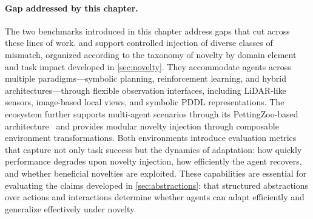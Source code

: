 \paragraph{Gap addressed by this chapter.}
The two benchmarks introduced in this chapter address gaps that cut across these lines of work. \NovelGridworlds{} and \NovelGym{} support controlled injection of diverse classes of mismatch, organized according to the taxonomy of novelty by domain element and task impact developed in \cref{sec:novelty}. They accommodate agents across multiple paradigms---symbolic planning, reinforcement learning, and hybrid architectures---through flexible observation interfaces, including LiDAR-like sensors, image-based local views, and symbolic PDDL representations. The \NovelGym{} ecosystem further supports multi-agent scenarios through its PettingZoo-based architecture~\citep{terry2021pettingzoo} and provides modular novelty injection through composable environment transformations. Both environments introduce evaluation metrics that capture not only task success but the dynamics of adaptation: how quickly performance degrades upon novelty injection, how efficiently the agent recovers, and whether beneficial novelties are exploited. These capabilities are essential for evaluating the claims developed in \cref{sec:abstractions}: that structured abstractions over actions and interactions determine whether agents can adapt efficiently and generalize effectively under novelty.
